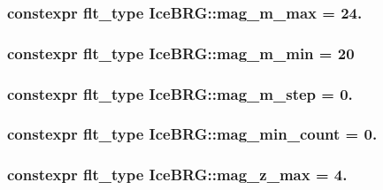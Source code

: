 \hypertarget{namespaceIceBRG_afe312c946480f9d2fa951168035a3a09}{
\subsubsection[{mag\-\_\-m\-\_\-max}]{\setlength{\rightskip}{0pt plus 5cm}constexpr {\bf flt\-\_\-type} Ice\-B\-R\-G\-::mag\-\_\-m\-\_\-max = 24.}}\label{namespaceIceBRG_afe312c946480f9d2fa951168035a3a09}
\hypertarget{namespaceIceBRG_af21cb728e53beb5bc6bf61e06d466535}{
\subsubsection[{mag\-\_\-m\-\_\-min}]{\setlength{\rightskip}{0pt plus 5cm}constexpr {\bf flt\-\_\-type} Ice\-B\-R\-G\-::mag\-\_\-m\-\_\-min = 20}}\label{namespaceIceBRG_af21cb728e53beb5bc6bf61e06d466535}
\hypertarget{namespaceIceBRG_a0dc0ffd6663af1f01df1e07c25556a13}{
\subsubsection[{mag\-\_\-m\-\_\-step}]{\setlength{\rightskip}{0pt plus 5cm}constexpr {\bf flt\-\_\-type} Ice\-B\-R\-G\-::mag\-\_\-m\-\_\-step = 0.}}\label{namespaceIceBRG_a0dc0ffd6663af1f01df1e07c25556a13}
\hypertarget{namespaceIceBRG_a64cda385b1f9579a049d1d58d0844611}{
\subsubsection[{mag\-\_\-min\-\_\-count}]{\setlength{\rightskip}{0pt plus 5cm}constexpr {\bf flt\-\_\-type} Ice\-B\-R\-G\-::mag\-\_\-min\-\_\-count = 0.}}\label{namespaceIceBRG_a64cda385b1f9579a049d1d58d0844611}
\hypertarget{namespaceIceBRG_ac405728ac8f0dd2dc9ef8e4e332c48a2}{
\subsubsection[{mag\-\_\-z\-\_\-max}]{\setlength{\rightskip}{0pt plus 5cm}constexpr {\bf flt\-\_\-type} Ice\-B\-R\-G\-::mag\-\_\-z\-\_\-max = 4.}}\label{namespaceIceBRG_ac405728ac8f0dd2dc9ef8e4e332c48a2}
